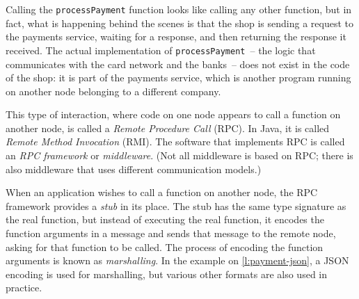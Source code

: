 Calling the \verb|processPayment| function looks like calling any other function, but in fact, what is happening behind the scenes is that the shop is sending a request to the payments service, waiting for a response, and then returning the response it received.
The actual implementation of \verb|processPayment|~-- the logic that communicates with the card network and the banks~-- does not exist in the code of the shop: it is part of the payments service, which is another program running on another node belonging to a different company.

This type of interaction, where code on one node appears to call a function on another node, is called a \emph{Remote Procedure Call} (RPC).
In Java, it is called \emph{Remote Method Invocation} (RMI).
The software that implements RPC is called an \emph{RPC framework} or \emph{middleware}.
(Not all middleware is based on RPC; there is also middleware that uses different communication models.)

When an application wishes to call a function on another node, the RPC framework provides a \emph{stub} in its place.
The stub has the same type signature as the real function, but instead of executing the real function, it encodes the function arguments in a message and sends that message to the remote node, asking for that function to be called.
The process of encoding the function arguments is known as \emph{marshalling}.
In the example on \autoref{l:payment-json}, a JSON encoding is used for marshalling, but various other formats are also used in practice.

